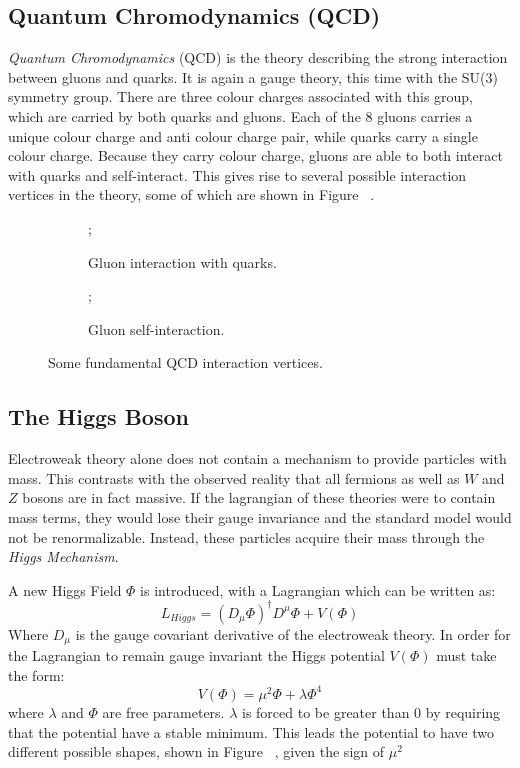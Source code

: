 \subsection{Quantum Chromodynamics (QCD)}
\textit{Quantum Chromodynamics} (QCD) is the theory describing the strong interaction between gluons and quarks. It is again a gauge theory, this time with the SU(3) symmetry group. There are three colour charges associated with this group, which are carried by both quarks and gluons. Each of the 8 gluons carries a unique colour charge and anti colour charge pair, while quarks carry a single colour charge. Because they carry colour charge, gluons are able to both interact with quarks and self-interact. This gives rise to several possible interaction vertices in the theory, some of which are shown in Figure ~.

\begin{figure}[H]
    \begin{subfigure}{.5\textwidth}
        \centering
        ;
        \caption{Gluon interaction with quarks.}
        \label{fig:QCDvertexa}
    \end{subfigure}
    \begin{subfigure}{.5\textwidth}
        \centering
        ;
        \caption{Gluon self-interaction.}
        \label{fig:QCDVertexb}
    \end{subfigure}
    \caption{Some fundamental QCD interaction vertices.}
    \label{fig:QCDVertices}
\end{figure}

\subsection{The Higgs Boson}
Electroweak theory alone does not contain a mechanism to provide particles with mass. This contrasts with the observed reality that all fermions as well as $W$ and $Z$ bosons are in fact massive. If the lagrangian of these theories were to contain mass terms, they would lose their gauge invariance and the standard model would not be renormalizable. Instead, these particles acquire their mass through the \textit{Higgs Mechanism}.

A new Higgs Field $\Phi$ is introduced, with a Lagrangian which can be written as:
$$ L_{Higgs} = (D_{\mu}\Phi)^{\dagger}D^{\mu}\Phi + V(\Phi) $$
Where $D_{\mu}$ is the gauge covariant derivative of the electroweak theory. In order for the Lagrangian to remain gauge invariant the Higgs potential $V(\Phi)$ must take the form:
$$V(\Phi) = {\mu}^2{\Phi} + {\lambda}{\Phi}^4 $$
where $\lambda$ and $\Phi$ are free parameters. $\lambda$ is forced to be greater than 0 by requiring that the potential have a stable minimum. This leads the potential to have two different possible shapes, shown in Figure ~, given the sign of $\mu^2$

